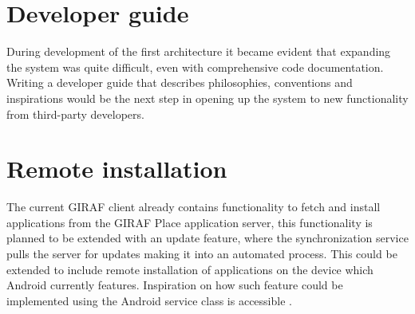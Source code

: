

\section{Developer guide}
During development of the first architecture it became evident that expanding the system was quite difficult, even with comprehensive code documentation. Writing a developer guide that describes philosophies, conventions and inspirations would be the next step in opening up the system to new functionality from third-party developers.

\section{Remote installation}
The current GIRAF client already contains functionality to fetch and install applications from the GIRAF Place application server, this functionality is planned to be extended with an update feature, where the synchronization service pulls the server for updates making it into an automated process. This could be extended to include remote installation of applications on the device which Android currently features. Inspiration on how such feature could be implemented using the Android service class is accessible \cite{DevRemote}. 